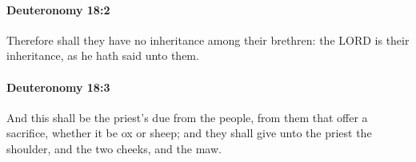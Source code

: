 		\paragraph{Deuteronomy 18:2} %
			\label{DEUTERONOMY-18-2}

			Therefore shall they have no inheritance among their brethren: the LORD is their inheritance, as he hath said unto them.


		\paragraph{Deuteronomy 18:3} %
			\label{DEUTERONOMY-18-3}

			And this shall be the priest's due from the people, from them that offer a sacrifice, whether it be ox or sheep; and they shall give unto the priest the shoulder, and the two cheeks, and the maw.


